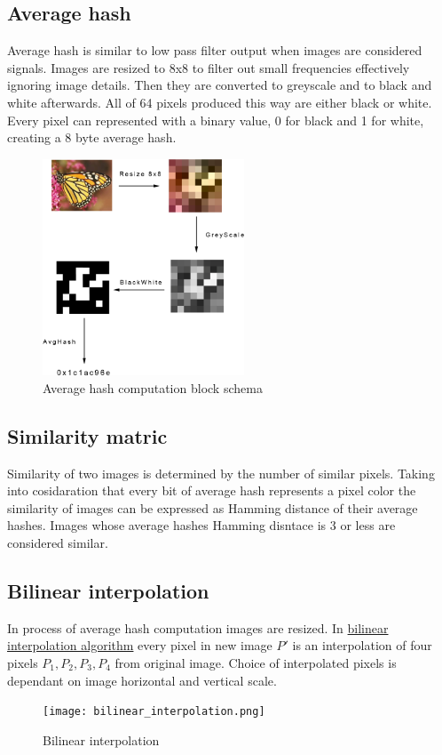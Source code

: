\documentclass{article}
\begin{document}
\subsection{Average hash}
Average hash is similar to low pass filter output when images are considered signals.
Images are resized to 8x8 to filter out small frequencies effectively ignoring image details.
Then they are converted to greyscale and to black and white afterwards. All of 64 pixels
produced this way are either black or white. Every pixel can represented with a binary
value, 0 for black and 1 for white, creating a 8 byte average hash.
\begin{figure}[h!]
    \centering
    \includegraphics[width=6cm]{avg_hash.png}
    \caption{Average hash computation block schema}
    \label{fig:average hash computation}
\end{figure}
\subsection{Similarity matric}
Similarity of two images is determined by the number of similar pixels. Taking into cosidaration
that every bit of average hash represents a pixel color the similarity of images can be
expressed as Hamming distance of their average hashes. Images whose average hashes Hamming
disntace is 3 or less are considered similar.
\subsection{Bilinear interpolation}
In process of average hash computation images are resized. In
\href{https://archive.org/download/Lectures_on_Image_Processing/EECE_4353_15_Resampling.pdf}
{bilinear interpolation algorithm} every pixel in new image $P'$ is an interpolation of four
pixels $P_1, P_2, P_3, P_4$ from original image. Choice of interpolated pixels is dependant on
image horizontal and vertical scale.
\begin{figure}[h!]
    \centering
    \texttt{[image: bilinear\_interpolation.png]}
    \caption{Bilinear interpolation}
    \label{fig:bilinear interpolation}
\end{figure}
\end{document}
